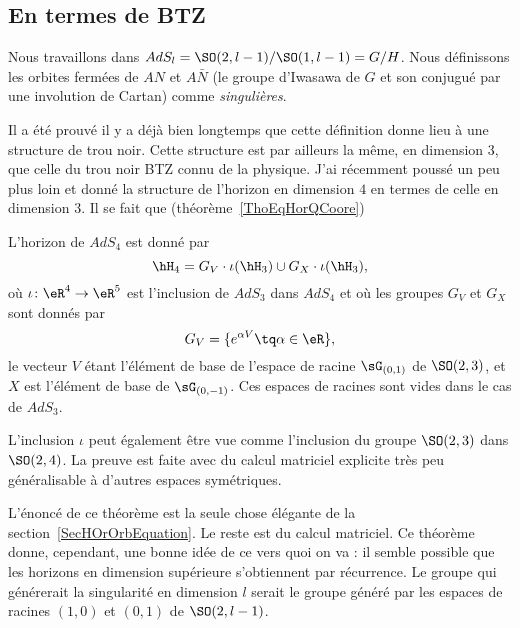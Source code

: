 \subsection{En termes de BTZ}

Nous travaillons dans $AdS_l=\SO(2,l-1)/\SO(1,l-1)=G/H$. Nous définissons les orbites fermées de $AN$ et $A\bar N$ (le groupe d'Iwasawa de $G$ et son conjugué par une involution de Cartan) comme \emph{singulières}.

Il a été prouvé il y a déjà bien longtemps que cette définition donne lieu à une structure de trou noir. Cette structure est par ailleurs la même, en dimension 3, que celle du trou noir BTZ connu de la physique. J'ai récemment poussé un peu plus loin et donné la structure de l'horizon en dimension $4$ en termes de celle en dimension $3$. Il se fait que (théorème~\ref{ThoEqHorQCoore})

\begin{theorem}
L'horizon de $AdS_4$ est donné par
\begin{equation}
	\hH_4=G_V\cdot \iota(\hH_3)\cup G_X\cdot\iota(\hH_3),
\end{equation}
où $\iota\colon \eR^4\to \eR^5$ est l'inclusion de $AdS_3$ dans $AdS_4$ et où les groupes $G_V$ et $G_X$ sont donnés par
\begin{equation}
	G_V=\{  e^{\alpha V}\tq\alpha\in\eR \},
\end{equation}
le vecteur $V$ étant l'élément de base de l'espace de racine $\sG_{(0,1)}$ de $\SO(2,3)$, et $X$ est l'élément de base de $\sG_{(0,-1)}$. Ces espaces de racines sont vides dans le cas de $AdS_3$.
\end{theorem}
L'inclusion $\iota$ peut également être vue comme l'inclusion du groupe $\SO(2,3)$ dans $\SO(2,4)$. La preuve est faite avec du calcul matriciel explicite très peu généralisable à d'autres espaces symétriques.

L'énoncé de ce théorème est la seule chose élégante de la section~\ref{SecHOrOrbEquation}. Le reste est du calcul matriciel. Ce théorème donne, cependant, une bonne idée de ce vers quoi on va : il semble possible que les horizons en dimension supérieure s'obtiennent par récurrence. Le groupe qui générerait la singularité en dimension $l$ serait le groupe généré par les espaces de racines $(1,0)$ et $(0,1)$ de $\SO(2,l-1)$.

